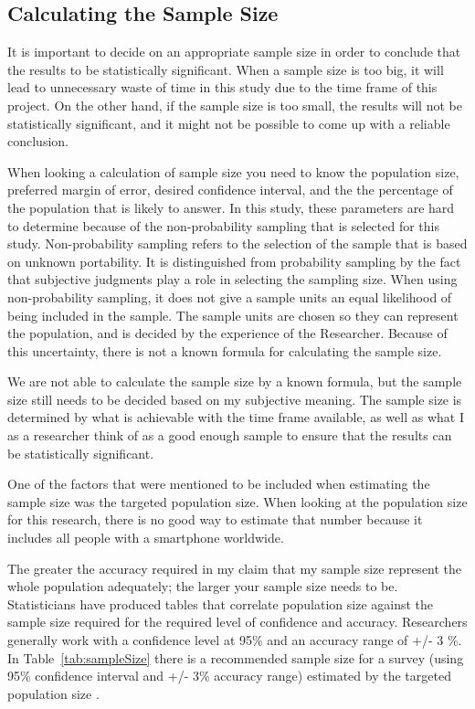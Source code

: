     \subsection{Calculating the Sample Size} \label{sec:samplesize}

    It is important to decide on an appropriate sample size in order to conclude that the results to be statistically significant. When a sample size is too big, it will lead to unnecessary waste of time in this study due to the time frame of this project. On the other hand, if the sample size is too small, the results will not be statistically significant, and it might not be possible to come up with a reliable conclusion. 

    When looking a calculation of sample size you need to know the population size, preferred margin of error, desired confidence interval, and the the percentage of the population that is likely to answer. In this study, these parameters are hard to determine because of the non-probability sampling that is selected for this study. Non-probability sampling refers to the selection of the sample that is based on unknown portability. It is distinguished from probability sampling by the fact that subjective judgments play a role in selecting the sampling size. When using non-probability sampling, it does not give a sample units an equal likelihood of being included in the sample. The sample units are chosen so they can represent the population, and is decided by the experience of the Researcher. Because of this uncertainty, there is not a known formula for calculating the sample size. 

    We are not able to calculate the sample size by a known formula, but the sample size still needs to be decided based on my subjective meaning. The sample size is determined by what is achievable with the time frame available, as well as what I as a researcher think of as a good enough sample to ensure that the results can be statistically significant. 

    One of the factors that were mentioned to be included when estimating the sample size was the targeted population size. When looking at the population size for this research, there is no good way to estimate that number because it includes all people with a smartphone worldwide. 

    The greater the accuracy required in my claim that my sample size represent the whole population adequately; the larger your sample size needs to be. Statisticians have produced tables that correlate population size against the sample size required for the required level of confidence and accuracy. Researchers generally work with a confidence level at 95\% and an accuracy range of +/- 3 \%. In Table~\ref{tab:sampleSize} there is a recommended sample size for a survey (using 95\% confidence interval and +/- 3\% accuracy range) estimated by the targeted population size \cite{empiriske}.  

